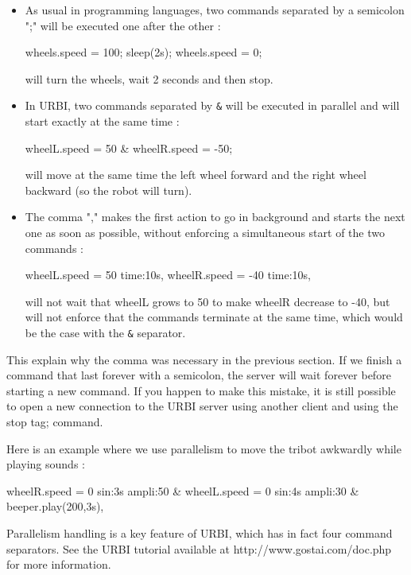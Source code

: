 \begin{itemize}
\item As usual in programming languages, two commands separated by a
  semicolon ";" will be executed one after the other :
\begin{urbiunchecked}
  wheels.speed = 100; sleep(2s); wheels.speed = 0;
\end{urbiunchecked}

will turn the wheels, wait 2 seconds and then stop.

\item In URBI, two commands separated by \lstinline|&| will be executed in
  parallel and will start exactly at the same time :
\begin{urbiunchecked}
  wheelL.speed = 50 & wheelR.speed = -50;
\end{urbiunchecked}

will move at the same time the left wheel forward and the right wheel
backward (so the robot will turn).

\item The comma "," makes the first action to go in background and starts
  the next one as soon as possible, without enforcing a simultaneous start
  of the two commands :
\begin{urbiunchecked}
  wheelL.speed = 50 time:10s, wheelR.speed = -40 time:10s,
\end{urbiunchecked}

will not wait that wheelL grows to 50 to make wheelR decrease to -40, but
will not enforce that the commands terminate at the same time, which would
be the case with the \lstinline|&| separator.
\end{itemize}

This explain why the comma was necessary in the previous section. If we finish
a command that last forever with a semicolon, the server will wait forever
before starting a new command. If you happen to make this mistake, it is still
possible to open a new connection to the URBI server using another client and
using the stop tag; command.

Here is an example where we use parallelism to move the tribot awkwardly while
playing sounds :
\begin{urbiunchecked}
  wheelR.speed = 0 sin:3s ampli:50 &
  wheelL.speed = 0 sin:4s ampli:30 &
  beeper.play(200,3s),
\end{urbiunchecked}

Parallelism handling is a key feature of URBI, which has in fact four command
separators. See the URBI tutorial available at http://www.gostai.com/doc.php
for more information.

